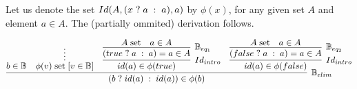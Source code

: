 Let us denote the set $Id(A, (x \; ? \; a \; : \; a), a)$ by $\phi(x)$, for any given set $A$ and
element $a \in A$. The (partially ommited) derivation follows.

\[
\infer[\BB_{elim}]
      {\ite{b}{id(a)}{id(a)} \in \phi(b) }
      { b \in \BB 
      & \infer*{\withhip{v \in \BB}{\isset{\phi(v)}}}{}
      & \infer[Id_{intro}]
              {id(a) \in \phi(true)}
              { \infer[\BB_{eq_1}]
                      {\ite{true}{a}{a} = a \in A}
                      {\isset{A}
                      & a \in A
                      } 
              }
      & \infer[Id_{intro}]
              {id(a) \in \phi(false)}
              { \infer[\BB_{eq_2}]
                      {\ite{false}{a}{a} = a \in A}
                      {\isset{A}
                      & a \in A
                      } 
              }
      }
\] 
